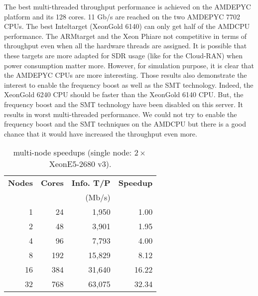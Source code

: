 The best multi-threaded throughput performance is achieved on the AMD\R EPYC
platform and its 128 cores. 11 Gb/s are reached on the two AMD\R EPYC 7702 CPUs.
The best Intel\R target (Xeon\TM Gold 6140) can only get half of the AMD\R CPU
performance. The ARM\R target and the Xeon Phi\TM are not competitive in terms
of throughput even when all the hardware threads are assigned. It is possible
that these targets are more adapted for SDR usage (like for the Cloud-RAN) when
power consumption matter more. However, for simulation purpose, it is clear that
the AMD\R EPYC CPUs are more interesting. Those results also demonstrate the
interest to enable the frequency boost as well as the SMT technology. Indeed,
the Xeon\TM Gold 6240 CPU should be faster than the Xeon\TM Gold 6140 CPU. But,
the frequency boost and the SMT technology have been disabled on this server. It
results in worst multi-threaded performance. We could not try to enable the
frequency boost and the SMT techniques on the AMD\R CPU but there is a good
chance that it would have increased the throughput even more.

\begin{table}[htp]
  \centering
  \caption{\AFFECT multi-node speedups (single node: $2\times$Xeon\TM E5-2680 v3).}
  \label{tab:eval_simu_speedup_mpi}
  \begin{tabular}{r  r  r  r}
  \textbf{Nodes} & \textbf{Cores} & \textbf{Info. T/P} & \textbf{Speedup} \\
                 &                & (Mb/s)             &                  \\
  \hline
  \hline
   1             &  24            &  1,950             &  1.00            \\
   2             &  48            &  3,901             &  1.95            \\
   4             &  96            &  7,793             &  4.00            \\
   8             & 192            & 15,829             &  8.12            \\
  16             & 384            & 31,640             & 16.22            \\
  32             & 768            & 63,075             & 32.34            \\
  \end{tabular}
\end{table}

